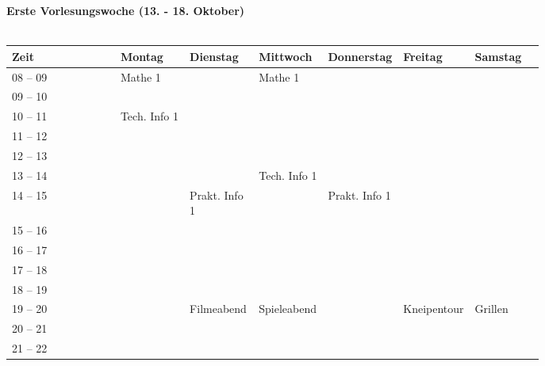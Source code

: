 \pagebreak
\textbf{Erste Vorlesungswoche (13. - 18. Oktober)}\\
\\
\begin{tabular}{|l|p{0.13\linewidth}|p{0.13\linewidth}|p{0.13\linewidth}|p{0.13\linewidth}|p{0.13\linewidth}|p{0.13\linewidth}|} \hline
Zeit & Montag & Dienstag & Mittwoch & Donnerstag & Freitag & Samstag \\ 
\hline \hline \cline{3-3}
08 -- 09 & \footnotesize{Mathe 1} & & \footnotesize{Mathe 1} & & &\\ \cline{1-1}
09 -- 10 &  & & & & &  \\ \cline{1-1} \cline{2-2} \cline{4-4}
10 -- 11 & \footnotesize{Tech. Info 1} & & & & & \\ \cline{1-1}
11 -- 12 & & & & & & \\ \cline{1-1} \cline{2-2}
12 -- 13 & & & & & & \\ \cline{1-1} \cline{4-4}
13 -- 14 & & & \footnotesize{Tech. Info 1}  & & & \\ \cline{1-1} \cline{3-3} \cline{4-4} \cline{5-5}
14 -- 15 & &\footnotesize{Prakt. Info 1} & &\footnotesize{Prakt. Info 1} & & \\ \cline{1-1}
15 -- 16 & & & & & & \\ \cline {1-1} \cline{3-3} \cline{5-5}
16 -- 17 & & & & & & \\ \cline{1-1}
17 -- 18 & & & & & & \\ \cline{1-1}
 18 -- 19 & & & & & &  \\ \cline{1-1}
19 -- 20 & &\cellcolor{lightlightgray} \footnotesize{Filmeabend} &\cellcolor{lightlightgray} \footnotesize{Spieleabend} & &\cellcolor{lightlightgray} \footnotesize{Kneipentour} & \cellcolor{lightlightgray} \footnotesize{Grillen} \\ \cline{1-1}
20 -- 21 & &\cellcolor{lightlightgray} &\cellcolor{lightlightgray}  & & \cellcolor{lightlightgray} &\cellcolor{lightlightgray}\\ \cline{1-1}
21 -- 22 & &\cellcolor{lightlightgray} & \cellcolor{lightlightgray} & &  \cellcolor{lightlightgray} &\cellcolor{lightlightgray}\\ \hline
\end{tabular}
\\

